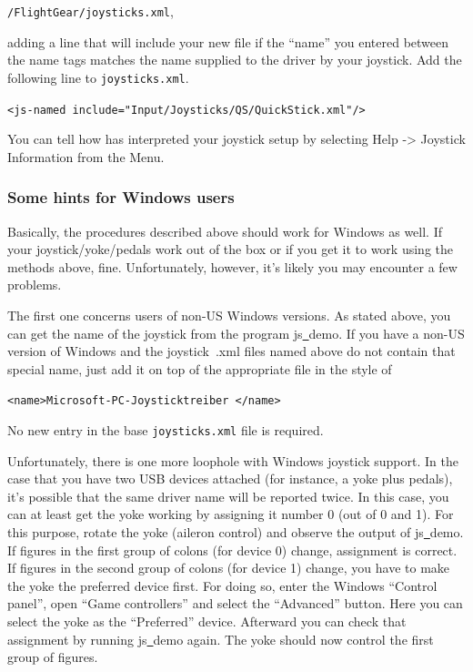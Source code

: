 \noindent
 \texttt{/FlightGear/joysticks.xml},


\noindent
adding a line that will include your new file if the ``name'' you entered between the name tags matches the name supplied to the driver by your joystick.  Add the following line to \texttt{joysticks.xml}.
\medskip

\noindent
	\texttt{<js-named include="Input/Joysticks/QS/QuickStick.xml"/>}
\medskip

You can tell how \FlightGear{} has interpreted your joystick setup by selecting
Help -> Joystick Information from the Menu.

\subsubsection{Some hints for Windows users\label{joyxp}}
Basically, the procedures described above should work for Windows as well. If your joystick/yoke/pedals work out of the box or if you get it to work using the methods above, fine. Unfortunately, however, it's likely you may encounter a few problems.

The first one concerns users of non-US Windows versions. As stated above, you can get the name of the joystick from the program js\underline{~}demo. If you have a non-US version of Windows and the joystick~.xml files named above do not contain that special name, just add it on top of the appropriate file in the style of
\medskip

 \texttt{<name>Microsoft-PC-Joysticktreiber </name>}
 \medskip

\noindent
No new entry in the base \texttt{joysticks.xml} file is required.

Unfortunately, there is one more loophole with Windows joystick support. In the case that you have two USB devices attached (for instance, a yoke plus pedals), it's possible that the same driver name will be reported twice. In this
case, you can at least get the yoke working by assigning it number 0 (out of
0 and 1). For this purpose, rotate the yoke (aileron control) and observe
the output of js\underline{~}demo. If figures in the first group of colons
(for device 0) change, assignment is correct. If figures in the second group
of colons (for device 1) change, you have to make the yoke the preferred
device first. For doing so, enter the
Windows ``Control panel'', open ``Game controllers'' and select the
``Advanced'' button. Here you can select the yoke as the ``Preferred''
device. Afterward you can check that assignment by running
js\underline{~}demo again. The yoke should now control the first group of
figures.

